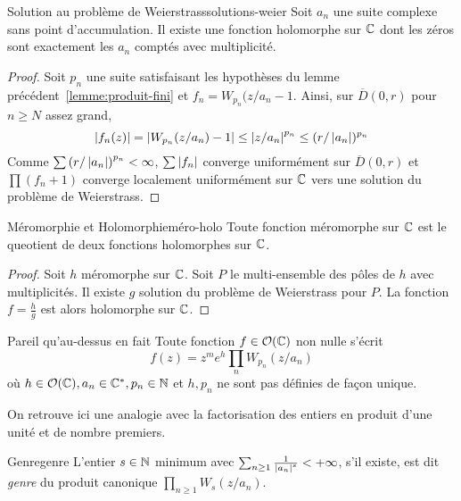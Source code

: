 \documentclass{cours}
\begin{document}
\begin{théorème}
	{Solution au problème de Weierstrass}{solutions-weier}
	Soit $a_{n}$ une suite complexe sans point d'accumulation. Il existe une fonction holomorphe sur $\mathbb{C}$ dont les zéros sont exactement les $a_{n}$ comptés avec multiplicité. 
\end{théorème}
\begin{proof}
	Soit $p_{n}$ une suite satisfaisant les hypothèses du lemme précédent~\ref{lemme:produit-fini} et $f_{n} = W_{p_{n}}(z/a_{n} - 1$. 
	Ainsi, sur $\overline{D}(0, r)$ pour $n \geq N$ assez grand, 
		\begin{equation*}
			\left|f_{n}(z)\right| = \left|W_{p_{n}}(z/a_{n}) - 1\right| \leq \left|z/a_{n}\right|^{p_{n}} \leq (r/\left|a_{n}\right|)^{p_{n}}
		\end{equation*}
	Comme $\sum \left(r/\left|a_{n}\right|\right)^{p_{n}} < \infty$, $\sum \left|f_{n}\right|$ converge uniformément sur $\overline{D}(0, r)$ et $\prod (f_{n} + 1)$ converge localement uniformément sur $\mathbb{C}$ vers une solution du problème de Weierstrass.	
\end{proof}

\begin{corollaire}
	{Méromorphie et Holomorphie}{méro-holo}
	Toute fonction méromorphe sur $\mathbb{C}$ est le queotient de deux fonctions holomorphes sur $\mathbb{C}$. 
\end{corollaire}
\begin{proof}
	Soit $h$ méromorphe sur $\mathbb{C}$. Soit $P$ le multi-ensemble des pôles de $h$ avec multiplicités. Il existe $g$ solution du problème de Weierstrass pour $P$. La fonction $f = \frac{h}{g}$ est alors holomorphe sur $\mathbb{C}$. 
\end{proof}


\begin{corollaire}
	{Pareil qu'au-dessus en fait}{}
	Toute fonction $f \in \mathcal{O}(\mathbb{C})$ non nulle s'écrit 
	\begin{equation*}
		f(z) = z^{m}e^{h}\prod_{n}W_{p_{n}}(z/a_{n})
	\end{equation*}
	où $h \in \mathcal{O}(\mathbb{C}), a_{n} \in \mathbb{C}^{*}, p_{n} \in \mathbb{N}$ et $h, p_{n}$ ne sont pas définies de façon unique. 
\end{corollaire}

On retrouve ici une analogie avec la factorisation des entiers en produit d'une unité et de nombre premiers. 

\begin{définition}
	{Genre}{genre}
	L'entier $s \in \mathbb{N}$ minimum avec $\sum_{n \geq 1} \frac{1}{\left|a_{n}\right|^{s}} < + \infty$, s'il existe, est dit \emph{genre} du produit canonique $\prod_{n \geq 1}W_{s}(z/a_{n})$. 
\end{définition}
\end{document}

